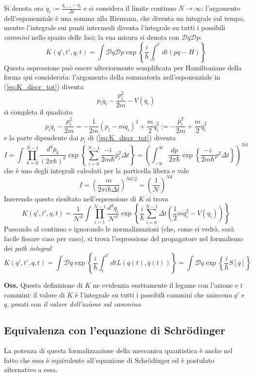 Si denota ora $\dot q_i:=\frac{q_{i+1}-q_i}{\Delta t}$ e si considera il limite continuo
$N\to\infty$: l'argomento dell'esponenziale è una somma alla Riemann, che diventa un integrale sul
tempo, mentre l'integrale sui punti intermedi diventa l'integrale su tutti i possibili
\textit{cammini} nello spazio delle fasi; la sua misura si denota con
$\mathcal{D}q\mathcal{D}p$:
$$K(q',t',q,t) = \int\mathcal{D}q\mathcal{D}p\exp\left\{\frac{i}{\hbar}\int_{t}^{t'}dt(p\dot q - H)
\right\}$$
Questa espressione può essere ulteriormente semplificata per Hamiltoniane della forma qui
considerata: l'argomento della sommatoria nell'esponenziale in (\ref{eq:K_discr_tot}) diventa
$$
p_i\dot q_i-\frac{p_i^2}{2m}-V(q_i)
$$
si completa il quadrato
$$
p_i\dot q_i-\frac{p_i^2}{2m}=-\frac{1}{2m}(p_i-m\dot q_i)^2 +\frac{m}{2}\dot q_i^2:=
-\frac{\bar p_i^2}{2m}+\frac{m}{2}\dot q_i^2
$$
e la parte dipendente dai $p_i$ di (\ref{eq:K_discr_tot}) diventa
$$
I=\int\prod_{k=0}^{N-1}\frac{d^d\bar p_k}{(2\pi\hbar)^d}\exp\left\{\sum_{i=0}^{N-1}\frac{-i}{2m\hbar}
\bar p_i^2\Delta t\right\} = \left(\int_{-\infty}^{\infty}\frac{dp}{2\pi\hbar}\exp\left\{\frac{-i}{2m
\hbar}p^2\Delta t\right\}\right)^{Nd}
$$
che è uno degli integrali calcolati per la particella libera e vale
$$I = \left(\frac{m}{2\pi i\hbar\Delta t}\right)^{Nd/2} = \left(\frac{1}{\mathcal{N}}\right)^{Nd}$$
Inserendo questo risultato nell'espressione di $K$ si trova
\begin{equation}
    \boxed{K(q',t',q,t)=\frac{1}{\mathcal{N}^d}\int\prod_{i=1}^{N-1}\frac{d^dq_i}{\mathcal{N}^d}
	\exp\left\{\frac{i}{\hbar}\sum_{i=0}^{N-1}\Delta t\left(\frac{1}{2}m\dot q_i^2-V(q_i)
	\right)\right\}}
	\label{eq:K_discr}
\end{equation}
Passando al continuo e ignorando le normalizzazioni (che, come si vedrà, sarà facile fissare caso per
caso), si trova l'espressione del propagatore nel formalismo dei \textit{path integral}
\begin{equation}
\boxed{K(q',t',q,t)=\int\mathcal{D}q\exp\left\{\frac{i}{\hbar}\int_{t}^{t'}dtL(q(t),\dot q(t))
\right\}=\int\mathcal{D}q\exp\left\{\frac{i}{\hbar}S[q]\right\}}
\label{eq:K}
\end{equation}

\textbf{Oss.} Questa definizione di $K$ ne evidenzia esattamente il legame con l'azione e i cammini:
il valore di $K$ è l'integrale su tutti i possibili cammini che uniscono $q'$ e $q$, pesati con
\textit{il valore dell'azione sul cammino}.
\subsection{Equivalenza con l'equazione di Schrödinger}
La potenza di questa formalizzazione della meccanica quantistica è anche nel fatto che essa è
equivalente all'equazione di Schrödinger ed è postulato alternativo a essa.

